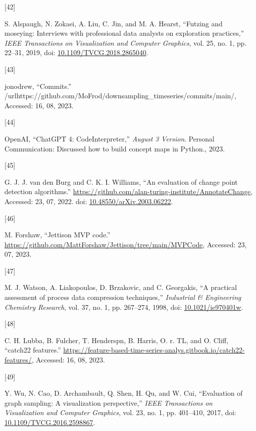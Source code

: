 \documentclass{article}
\newlength{\cslhangindent}
\newlength{\csllabelwidth}
\newlength{\cslentryspacingunit} %
\newenvironment{CSLReferences}[2] %
 {%
  \setlength{\parindent}{0pt}
  \ifodd #1
  \let\oldpar\par
  \def\par{\hangindent=\cslhangindent\oldpar}
  \fi
  \setlength{\parskip}{#2\cslentryspacingunit}
 }%
 {}
\newcommand{\CSLLeftMargin}[1]{\parbox[t]{\csllabelwidth}{#1}}
\newcommand{\CSLRightInline}[1]{\parbox[t]{\linewidth - \csllabelwidth}{#1}\break}
\begin{document}
\begin{CSLReferences}{0}{0}
\leavevmode{}%
\CSLLeftMargin{{[}42{]} }
\CSLRightInline{S. Alspaugh, N. Zokaei, A. Liu, C. Jin, and M. A.
Hearst, {``Futzing and moseying: Interviews with professional data
analysts on exploration practices,''} \emph{IEEE Transactions on
Visualization and Computer Graphics}, vol. 25, no. 1, pp. 22--31, 2019,
doi:
\href{https://doi.org/10.1109/TVCG.2018.2865040}{10.1109/TVCG.2018.2865040}.}

\leavevmode{}%
\CSLLeftMargin{{[}43{]} }
\CSLRightInline{jonodrew, {``Commits.''}
/url{https://github.com/MoFrod/downsampling\_timeseries/commits/main/},
Accessed: 16, 08, 2023.}

\leavevmode{}%
\CSLLeftMargin{{[}44{]} }
\CSLRightInline{OpenAI, {``ChatGPT 4: CodeInterpreter,''} \emph{August 3
Version}. Personal Communication: Discussed how to build concept maps in
Python., 2023.}

\leavevmode{}%
\CSLLeftMargin{{[}45{]} }
\CSLRightInline{G. J. J. van den Burg and C. K. I. Williams, {``An
evaluation of change point detection algorithms.''}
\url{https://github.com/alan-turing-institute/AnnotateChange}, Accessed:
23, 07, 2022. doi:
\href{https://doi.org/10.48550/arXiv.2003.06222}{10.48550/arXiv.2003.06222}.}

\leavevmode{}%
\CSLLeftMargin{{[}46{]} }
\CSLRightInline{M. Forshaw, {``Jettison MVP code.''}
\url{https://github.com/MattForshaw/Jettison/tree/main/MVPCode},
Accessed: 23, 07, 2023.}

\leavevmode{}%
\CSLLeftMargin{{[}47{]} }
\CSLRightInline{M. J. Watson, A. Liakopoulos, D. Brzakovic, and C.
Georgakis, {``A practical assessment of process data compression
techniques,''} \emph{Industrial \& Engineering Chemistry Research}, vol.
37, no. 1, pp. 267--274, 1998, doi:
\href{https://doi.org/10.1021/ie970401w}{10.1021/ie970401w}.}

\leavevmode{}%
\CSLLeftMargin{{[}48{]} }
\CSLRightInline{C. H. Lubba, B. Fulcher, T. Henderspn, B. Harris, O. r.
TL, and O. Cliff, {``catch22 features.''}
\url{https://feature-based-time-series-analys.gitbook.io/catch22-features/},
Accessed: 16, 08, 2023.}

\leavevmode{}%
\CSLLeftMargin{{[}49{]} }
\CSLRightInline{Y. Wu, N. Cao, D. Archambault, Q. Shen, H. Qu, and W.
Cui, {``Evaluation of graph sampling: A visualization perspective,''}
\emph{IEEE Transactions on Visualization and Computer Graphics}, vol.
23, no. 1, pp. 401--410, 2017, doi:
\href{https://doi.org/10.1109/TVCG.2016.2598867}{10.1109/TVCG.2016.2598867}.}

\end{CSLReferences}



\end{document}
